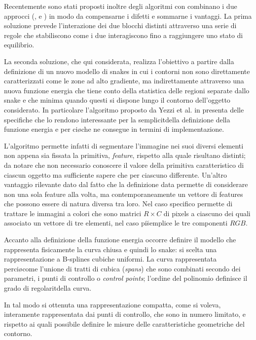 Recentemente sono stati proposti inoltre degli algoritmi con combinano i due
approcci (\cite{Duncan}, \cite{Yuille} e \cite{Yezzi}) in modo da compensarne i difetti e
sommarne i vantaggi.
La prima soluzione \cite{Duncan} prevede l'interazione dei due blocchi distinti attraverso
una serie di regole che stabiliscono come i due interagiscono fino a raggiungere uno stato di
equilibrio.

La seconda soluzione, che \e qui considerata, realizza l'obiettivo a partire dalla
definizione di un nuovo modello di snakes in cui i contorni non sono direttamente
caratterizzati come le zone ad alto gradiente, ma indirettamente attraverso
una nuova funzione energia che tiene conto della statistica delle regioni separate dallo
snake e che \e minima quando questi si dispone lungo il contorno dell'oggetto considerato.
In particolare l'algoritmo proposto da Yezzi et al. in \cite{Yezzi} presenta delle specifiche
che lo rendono interessante per la semplicit\a della definizione della funzione energia e 
per ci\o che ne consegue in termini di implementazione.

L'algoritmo permette infatti di segmentare l'immagine nei suoi diversi elementi non appena
sia fissata la primitiva, {\it feature}, rispetto alla quale risultano distinti; \e da
notare che non \e necessario conoscere il valore della primitiva caratteristico di ciascun
oggetto ma \e sufficiente sapere che per ciascuno \e differente.
Un'altro vantaggio rilevante \e dato dal fatto che la definizione data permette di considerare
non una sola feature alla volta, ma contemporaneamente un vettore di features che possono
essere di natura diversa tra loro.
Nel caso specifico permette di trattare le immagini a colori che sono matrici $R \times C$ di 
pixels a ciascuno dei quali \e associato un vettore di tre elementi, nel caso pi\u semplice
le tre componenti $RGB$.

Accanto alla definizione della funzione energia occorre definire il modello che 
rappresenta fisicamente la curva chiusa e quindi lo snake: si \e scelta
una rappresentazione a B-splines cubiche uniformi.
La curva \e rappresentata perci\o come l'unione di tratti di cubica ({\it spans}) che sono
combinati secondo dei parametri, i punti di controllo o {\it control points}; l'ordine del
polinomio definisce il grado di regolarit\a della curva.

In tal modo si \e ottenuta una rappresentazione compatta, come si voleva, 
interamente rappresentata dai punti di controllo, che sono in numero limitato, e rispetto
ai quali \e possibile definire le misure delle caratteristiche geometriche del contorno.

